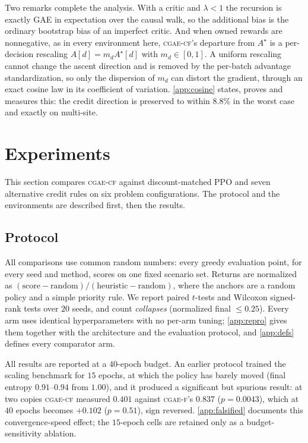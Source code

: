 \documentclass[review,authoryear,3p,times]{elsarticle}
\newcommand{\cflow}{\textsc{cgae-cf}}          %
\newcommand{\cflowraw}{\textsc{cgae-f}}        %
\begin{document}
Two remarks complete the analysis. With a critic and $\lambda<1$ the recursion
is exactly GAE in expectation over the causal walk, so the additional bias is
the ordinary bootstrap bias of an imperfect critic. And when owned rewards are
nonnegative, as in every environment here, \cflow's departure from $A^{\star}$
is a per-decision rescaling $A[d]=m_d A^{\star}[d]$ with $m_d\in[0,1]$. A
uniform rescaling cannot change the ascent direction and is removed by the
per-batch advantage standardization, so only the dispersion of $m_d$ can
distort the gradient, through an exact cosine law in its coefficient of
variation. \ref{app:cosine} states, proves and measures this: the credit
direction is preserved to within $8.8\%$ in the worst case and exactly on
multi-site.

\section{Experiments}
\label{sec:exp}

This section compares \cflow{} against discount-matched PPO and seven
alternative credit rules on six problem configurations. The protocol and the
environments are described first, then the results.

\subsection{Protocol}

All comparisons use common random numbers: every greedy evaluation point, for
every seed and method, scores on one fixed scenario set. Returns are normalized
as $(\text{score}-\text{random})/(\text{heuristic}-\text{random})$, where the
anchors are a random policy and a simple priority rule. We report paired
$t$-tests and Wilcoxon signed-rank tests over $20$ seeds, and count
\emph{collapses} (normalized final $\le0.25$). Every arm uses identical
hyperparameters with no per-arm tuning; \ref{app:repro} gives them together
with the architecture and the evaluation protocol, and \ref{app:defs} defines
every comparator arm.

All results are reported at a $40$-epoch budget. An earlier protocol trained
the scaling benchmark for $15$ epochs, at which the policy has barely moved
(final entropy $0.91$--$0.94$ from $1.00$), and it produced a significant but
spurious result: at two copies \cflow{} measured $0.401$ against \cflowraw's
$0.837$ ($p=0.0043$), which at $40$ epochs becomes $+0.102$ ($p=0.51$), sign
reversed. \ref{app:falsified} documents this convergence-speed effect; the
$15$-epoch cells are retained only as a budget-sensitivity ablation.
\end{document}

